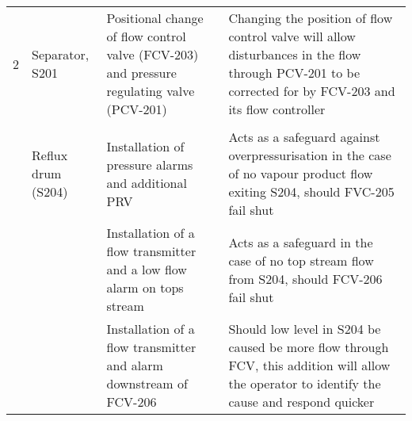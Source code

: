 \begin{table}
\begin{tabularx}{\linewidth}{@{}l>{\raggedright}p{2cm}XX@{}}
2   & Separator, S201           &      Positional change of flow control valve (FCV-203) and pressure regulating valve (PCV-201)                                                                                                                                                         &         Changing the position of flow control valve will allow disturbances in the flow through PCV-201 to be corrected for by FCV-203 and its flow controller                                                                                                                                                                                                     \\ \cmidrule(l){3-4} 
    &                           &                                                                                                                                                               &                                                                                                                                                                                                              \\ \cmidrule(l){2-4} 
    & Reflux drum (S204)         & Installation of pressure alarms and additional PRV                                                                                &      Acts as a safeguard against overpressurisation in the case of no vapour product flow exiting S204, should FVC-205 fail shut                                                                                                                                                                                                        \\ \cmidrule(l){3-4} 
    &                           & Installation of a flow transmitter and a low flow alarm on tops stream                                                                                                                                                   &                          Acts as a safeguard in the case of no top stream flow from S204, should FCV-206 fail shut                                                                                                                                                                               \\ \cmidrule(l){3-4} 
    &                           &         Installation of a flow transmitter and alarm downstream of FCV-206                                                                                                                                                      &                    Should low level in S204 be caused be more flow through FCV, this addition will allow the operator to identify the cause and respond quicker                                                               \\ \cmidrule(l){3-4}

\end{tabularx}
\end{table}
